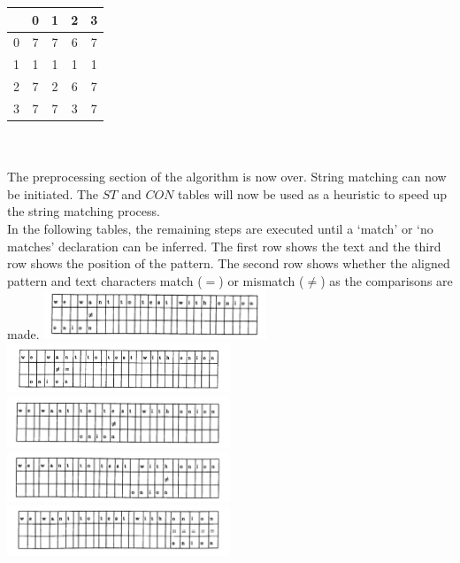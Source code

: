 \begin{tabular}{ | c | c c c c | }
\toprule
    & 0 & 1 & 2 & 3  \\
\midrule
  0 & 7 & 7 & 6 & 7  \\
  1 & 1 & 1 & 1 & 1  \\
  2 & 7 & 2 & 6 & 7  \\
  3 & 7 & 7 & 3 & 7  \\
\bottomrule
\end{tabular}\\
 \\
The preprocessing section of the algorithm is now over. String matching can now be initiated. The $ST$ and $CON$ tables will now be used as a heuristic to speed up the string matching process.\\
In the following tables, the remaining steps are executed until a `match' or `no matches' declaration can be inferred. The first row shows the text and the third row shows the position of the pattern. The second row shows whether the aligned pattern and text characters match ($=$) or mismatch ($\neq$) as the comparisons are made.
\includegraphics[width=0.5\textwidth]{img/br-1.png}
\includegraphics[width=0.5\textwidth]{img/br-2.png}
\includegraphics[width=0.5\textwidth]{img/br-3.png}
\includegraphics[width=0.5\textwidth]{img/br-4.png}
\includegraphics[width=0.5\textwidth]{img/br-5.png}

